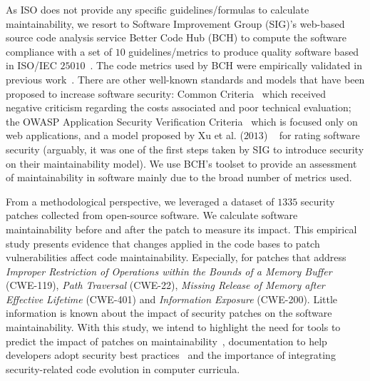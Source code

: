 \documentclass[10pt,conference]{IEEEtran}
\begin{document}
As ISO does not provide any specific guidelines/formulas to calculate 
maintainability, we resort to Software Improvement Group (SIG)'s web-based source 
code analysis service Better Code Hub (BCH) to compute the software compliance 
with a set of $10$ guidelines/metrics to produce quality software 
based in ISO/IEC $25010$~\cite{Visser:2016:OREILLY}. The code metrics used by BCH 
were empirically validated in previous work~\cite{Bijlsma:2012:FIR:2317098.2317124, 8530041, cruz2019energyoriented}. 
There are other well-known standards and models that have been proposed
to increase software security: Common Criteria~\cite{common:2009} which received
negative criticism regarding the costs associated and poor technical evaluation;
the OWASP Application Security Verification Criteria~\cite{oswap:2009} which is
focused only on web applications, and a model proposed by Xu et al. ($2013$)
~\cite{6616351} for rating software security (arguably, it was one of the
first steps taken by SIG to introduce security on their maintainability model). 
%
We use BCH's toolset to provide an assessment of maintainability in 
software mainly due to the broad number of metrics used.

From a methodological 
perspective, we leveraged a dataset of $1335$ security patches collected from open-source 
software. We calculate software maintainability before and after the patch to measure its 
impact. This empirical study presents evidence that changes 
applied in the code bases to patch vulnerabilities affect code maintainability. Especially, 
for patches that address \emph{Improper Restriction of Operations within the Bounds of 
a Memory Buffer} (CWE-119), \emph{Path Traversal} (CWE-22), \emph{Missing Release of Memory 
after Effective Lifetime} (CWE-401) and \emph{Information Exposure} (CWE-200).
Little information is known about the impact of security patches on the software
maintainability. With this study, 
we intend to highlight the need for tools to predict the impact of patches on 
maintainability~\cite{4724577}, documentation to help developers adopt security 
best practices~\cite{6311252, 7927935, MESQUIDA201519} and the importance of integrating
security-related code evolution in computer curricula.
%
%
\end{document}
